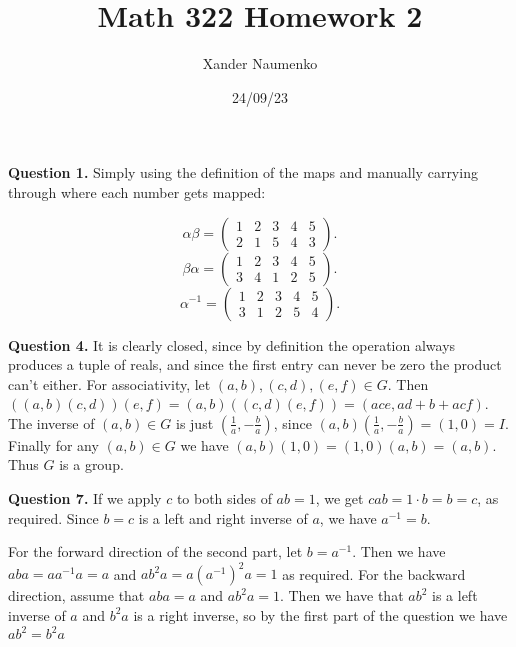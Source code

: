 \documentclass[letterpaper, reqno,11pt]{article}
\begin{document}
\title{Math 322 Homework 2}
\date{24/09/23}
\author{Xander Naumenko}
\maketitle

{\medskip\noindent\bf Question 1.} Simply using the definition of the maps and manually carrying through where each number gets mapped:

\[
    \alpha\beta=\begin{pmatrix} 1&2&3&4&5\\ 2&1&5&4&3 \end{pmatrix} 
.\]
\[
    \beta\alpha=\begin{pmatrix} 1&2&3&4&5\\ 3&4&1&2&5 \end{pmatrix} 
.\]
\[
    \alpha ^{-1}=\begin{pmatrix} 1&2&3&4&5\\ 3&1&2&5&4 \end{pmatrix} 
.\]

{\medskip\noindent\bf Question 4.} It is clearly closed, since by definition the operation always produces a tuple of reals, and since the first entry can never be zero the product can't either. For associativity, let $(a,b),(c,d),(e,f)\in G$. Then $((a,b)(c,d))(e,f)=(a,b)((c,d)(e,f))=(ace, ad+b+acf)$. The inverse of $(a,b)\in G$ is just $(\frac{1}{a}, -\frac{b}{a})$, since $(a,b)(\frac{1}{a},-\frac{b}{a})=(1,0)=I$. Finally for any $(a,b)\in G$ we have $(a,b)(1,0)=(1,0)(a,b)=(a,b)$. Thus $G$ is a group.

{\medskip\noindent\bf Question 7.} If we apply $c$ to both sides of $ab=1$, we get $cab=1\cdot b=b=c$, as required. Since $b=c$ is a left and right inverse of $a$, we have $a^{-1}=b$.

For the forward direction of the second part, let $b=a^{-1}$. Then we have $aba=aa^{-1}a=a$ and $ab^2a=a(a^{-1})^2a=1$ as required. For the backward direction, assume that $aba=a$ and $ab^2a=1$. Then we have that $ab^2$ is a left inverse of $a$ and $b^2a$ is a right inverse, so by the first part of the question we have $ab^2=b^2a$
\end{document}
